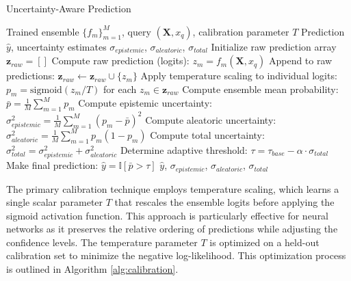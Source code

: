 \documentclass[journal]{IEEEtran}
\begin{document}
\begin{algorithm}[t]
\caption{Uncertainty-Aware Prediction}
\label{alg:uncertainty_prediction}
\begin{algorithmic}[1]
\REQUIRE Trained ensemble $\{f_m\}_{m=1}^M$, query $(\mathbf{X}, x_q)$, calibration parameter $T$
\ENSURE Prediction $\hat{y}$, uncertainty estimates $\sigma_{epistemic}$, $\sigma_{aleatoric}$, $\sigma_{total}$
\STATE Initialize raw prediction array $\mathbf{z}_{raw} = []$
    \STATE Compute raw prediction (logits): $z_m = f_m(\mathbf{X}, x_q)$
    \STATE Append to raw predictions: $\mathbf{z}_{raw} \leftarrow \mathbf{z}_{raw} \cup \{z_m\}$
\ENDFOR
\STATE Apply temperature scaling to individual logits: $p_m = \text{sigmoid}(z_m / T)$ for each $z_m \in \mathbf{z}_{raw}$
\STATE Compute ensemble mean probability: $\bar{p} = \frac{1}{M} \sum_{m=1}^M p_m$
\STATE Compute epistemic uncertainty: $\sigma_{epistemic}^2 = \frac{1}{M} \sum_{m=1}^M (p_m - \bar{p})^2$
\STATE Compute aleatoric uncertainty: $\sigma_{aleatoric}^2 = \frac{1}{M} \sum_{m=1}^M p_m(1 - p_m)$
\STATE Compute total uncertainty: $\sigma_{total}^2 = \sigma_{epistemic}^2 + \sigma_{aleatoric}^2$
\STATE Determine adaptive threshold: $\tau = \tau_{base} - \alpha \cdot \sigma_{total}$ 
\STATE Make final prediction: $\hat{y} = \mathbb{I}[\bar{p} > \tau]$
\RETURN $\hat{y}$, $\sigma_{epistemic}$, $\sigma_{aleatoric}$, $\sigma_{total}$
\end{algorithmic}
\end{algorithm}

The primary calibration technique employs temperature scaling, which learns a single scalar parameter $T$ that rescales the ensemble logits before applying the sigmoid activation function. This approach is particularly effective for neural networks as it preserves the relative ordering of predictions while adjusting the confidence levels. The temperature parameter $T$ is optimized on a held-out calibration set to minimize the negative log-likelihood. This optimization process is outlined in Algorithm \ref{alg:calibration}.
\end{document}
